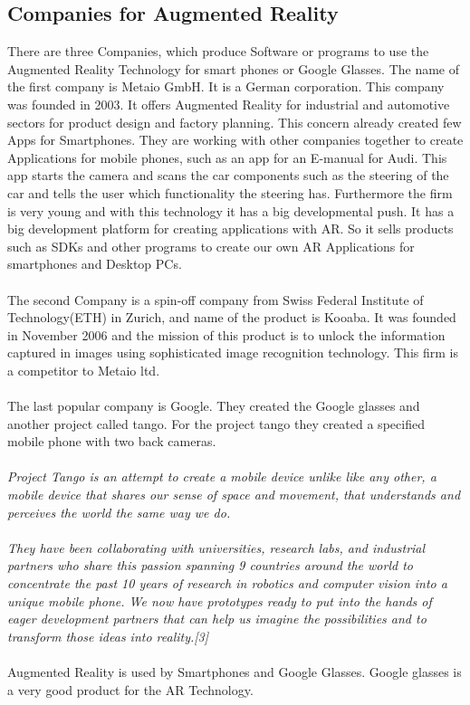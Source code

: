 \subsection{Companies for Augmented Reality}
There are three Companies, which produce Software or programs to use the Augmented Reality Technology for smart phones or Google Glasses.  The name of the first company is Metaio GmbH. It is a German corporation. This company was founded in 2003. It offers Augmented Reality for industrial and automotive sectors for product design and factory planning. This concern already created few Apps for Smartphones. They are working with other companies together to create Applications for mobile phones, such as an app for an E-manual for  Audi. This app  starts the camera and scans the car components such as the steering of the car and tells the user which functionality the steering has. Furthermore the firm is very young and with this technology it has a big developmental push. It has a big development platform for creating applications with AR. So it sells products such as SDKs and other programs to create our own AR Applications for smartphones and Desktop PCs.
\\
\\
The second Company is a spin-off company from Swiss Federal Institute of Technology(ETH) in Zurich, and name of  the product is Kooaba. It was founded  in November 2006 and the mission of this product is to unlock the information captured in images using sophisticated image recognition technology. This firm is a competitor to Metaio ltd.
\\
\\ 
The last popular company is Google. They created the Google glasses and another project called tango.  For the project tango they created a specified mobile phone with two back cameras.
\\
\\

\textit{ Project Tango is an attempt to create a mobile device unlike like any other, a mobile device that shares our sense of space and movement, that understands and perceives the world the same way we do.}
\\
\\
\textit{
They have been collaborating with universities, research labs, and industrial partners who share this passion spanning 9 countries around the world to concentrate the past 10 years of research in robotics and computer vision into a unique mobile phone. We now have prototypes ready to put into the hands of eager development partners that can help us imagine the possibilities and to transform those ideas into reality.[3]
}
\\
\\
Augmented Reality is used by Smartphones and Google Glasses. Google glasses is a very good product for the AR Technology.

